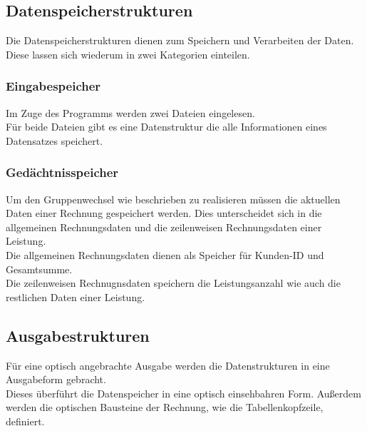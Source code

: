 \subsection{Datenspeicherstrukturen}\label{subsubsec:dynamische-datenstrukturen}
Die Datenspeicherstrukturen dienen zum Speichern und Verarbeiten der Daten.\\
Diese lassen sich wiederum in zwei Kategorien einteilen.\\

\subsubsection{Eingabespeicher}\label{subsubsubsec:eingabespeicher}
Im Zuge des Programms werden zwei Dateien eingelesen.\\
Für beide Dateien gibt es eine Datenstruktur die alle Informationen eines Datensatzes speichert.\\

\subsubsection{Gedächtnisspeicher}\label{subsubsubsubsec:gedaechtnisspeicher}
Um den Gruppenwechsel wie beschrieben zu realisieren müssen die aktuellen Daten einer Rechnung gespeichert werden. Dies unterscheidet sich in die allgemeinen Rechnungsdaten und die zeilenweisen Rechnungsdaten einer Leistung.\\
Die allgemeinen Rechnungsdaten dienen als Speicher für Kunden-ID und Gesamtsumme.\\
Die zeilenweisen Rechnugnsdaten speichern die Leistungsanzahl wie auch die restlichen Daten einer Leistung.\\

\subsection{Ausgabestrukturen}\label{subsubsec:ausgabestrukturen}
Für eine optisch angebrachte Ausgabe werden die Datenstrukturen in eine Ausgabeform gebracht.\\
Dieses überführt die Datenspeicher in eine optisch einsehbahren Form. Außerdem werden die optischen Bausteine der Rechnung, wie die Tabellenkopfzeile, definiert.\\